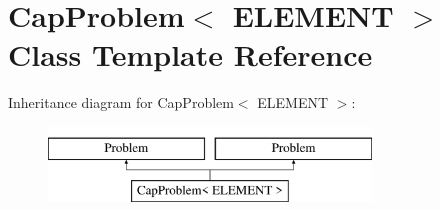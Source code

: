 \hypertarget{classCapProblem}{}\section{Cap\+Problem$<$ E\+L\+E\+M\+E\+NT $>$ Class Template Reference}
\label{classCapProblem}
Inheritance diagram for Cap\+Problem$<$ E\+L\+E\+M\+E\+NT $>$\+:\begin{figure}[H]
\begin{center}
\leavevmode
\includegraphics[height=2.000000cm]{classCapProblem}
\end{center}
\end{figure}
